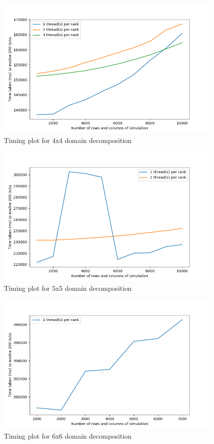\documentclass[12pt]{article}
\begin{document}
\begin{figure}[hp]
    \includegraphics[scale=0.65, center]{figures/time_hybrid_r16_plot.png}
    \caption{Timing plot for 4x4 domain decomposition}
    \label{fig:time_r16}
\end{figure}

\begin{figure}[hp]
    \includegraphics[scale=0.65, center]{figures/time_hybrid_r25_plot.png}
    \caption{Timing plot for 5x5 domain decomposition}
    \label{fig:time_r25}
\end{figure}

\begin{figure}[hp]
    \includegraphics[scale=0.65, center]{figures/time_hybrid_r36_plot.png}
    \caption{Timing plot for 6x6 domain decomposition}
    \label{fig:time_r36}
\end{figure}
\end{document}
